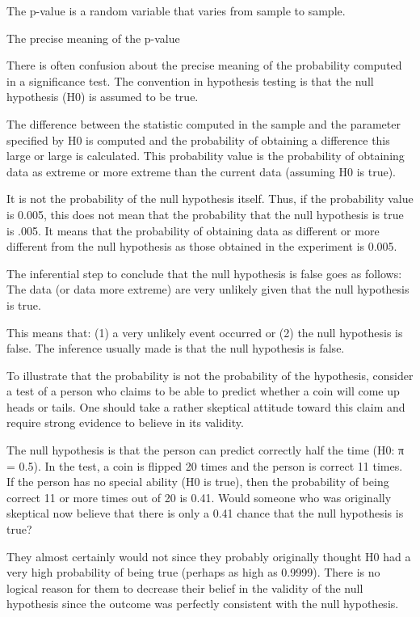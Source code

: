  

The p-value is a random variable that varies from sample to sample.


The precise meaning of the p-value


There is often confusion about the precise meaning of the probability computed in a significance test. The convention in hypothesis testing is that the null hypothesis (H0) is assumed to be true. 


The difference between the statistic computed in the sample and the parameter specified by H0 is computed and the probability of obtaining a difference this large or large is calculated. This probability value is the probability of obtaining data as extreme or more extreme than the current data (assuming H0 is true). 


It is not the probability of the null hypothesis itself. Thus, if the probability value is 0.005, this does not mean that the probability that the null hypothesis is true is .005. It means that the probability of obtaining data as different or more different from the null hypothesis as those obtained in the experiment is 0.005.


The inferential step to conclude that the null hypothesis is false goes as follows: The data (or data more extreme) are very unlikely given that the null hypothesis is true. 

This means that: (1) a very unlikely event occurred or (2) the null hypothesis is false. The inference usually made is that the null hypothesis is false. 


To illustrate that the probability is not the probability of the hypothesis, consider a test of a person who claims to be able to predict whether a coin will come up heads or tails. One should take a rather skeptical attitude toward this claim and require strong evidence to believe in its validity. 


The null hypothesis is that the person can predict correctly half the time (H0: π = 0.5). In the test, a coin is flipped 20 times and the person is correct 11 times. If the person has no special ability (H0 is true), then the probability of being correct 11 or more times out of 20 is 0.41. Would someone who was originally skeptical now believe that there is only a 0.41 chance that the null hypothesis is true? 


They almost certainly would not since they probably originally thought H0 had a very high probability of being true (perhaps as high as 0.9999). There is no logical reason for them to decrease their belief in the validity of the null hypothesis since the outcome was perfectly consistent with the null hypothesis. 


